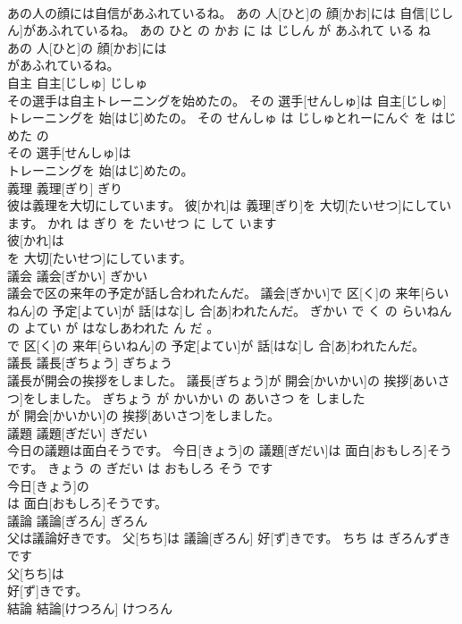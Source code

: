 \documentclass[8pt]{extreport}
\begin{document}
\begin{CJK}{UTF8}{min}
\\	あの人の顔には自信があふれているね。	あの 人[ひと]の 顔[かお]には 自信[じしん]があふれているね。	あの ひと の かお に は じしん が あふれて いる ね	
\\	あの 人[ひと]の 顔[かお]には
\\	があふれているね。			
\\	自主	自主[じしゅ]	じしゅ	
\\	その選手は自主トレーニングを始めたの。	その 選手[せんしゅ]は 自主[じしゅ]トレーニングを 始[はじ]めたの。	その せんしゅ は じしゅとれーにんぐ を はじめた の	
\\	その 選手[せんしゅ]は
\\	トレーニングを 始[はじ]めたの。			
\\	義理	義理[ぎり]	ぎり	
\\	彼は義理を大切にしています。	彼[かれ]は 義理[ぎり]を 大切[たいせつ]にしています。	かれ は ぎり を たいせつ に して います	
\\	彼[かれ]は
\\	を 大切[たいせつ]にしています。			
\\	議会	議会[ぎかい]	ぎかい	
\\	議会で区の来年の予定が話し合われたんだ。	議会[ぎかい]で 区[く]の 来年[らいねん]の 予定[よてい]が 話[はな]し 合[あ]われたんだ。	ぎかい で く の らいねん の よてい が はなしあわれた ん だ 。	
\\	で 区[く]の 来年[らいねん]の 予定[よてい]が 話[はな]し 合[あ]われたんだ。			
\\	議長	議長[ぎちょう]	ぎちょう	
\\	議長が開会の挨拶をしました。	議長[ぎちょう]が 開会[かいかい]の 挨拶[あいさつ]をしました。	ぎちょう が かいかい の あいさつ を しました	
\\	が 開会[かいかい]の 挨拶[あいさつ]をしました。			
\\	議題	議題[ぎだい]	ぎだい	
\\	今日の議題は面白そうです。	今日[きょう]の 議題[ぎだい]は 面白[おもしろ]そうです。	きょう の ぎだい は おもしろ そう です	
\\	今日[きょう]の
\\	は 面白[おもしろ]そうです。			
\\	議論	議論[ぎろん]	ぎろん	
\\	父は議論好きです。	父[ちち]は 議論[ぎろん] 好[ず]きです。	ちち は ぎろんずき です	
\\	父[ちち]は
\\	好[ず]きです。			
\\	結論	結論[けつろん]	けつろん	

\end{CJK}
\end{document}
